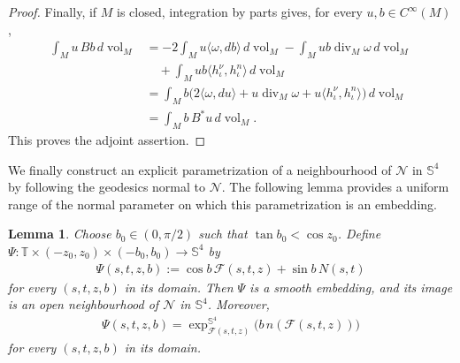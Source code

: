 \documentclass[a4paper,11pt,oneside,reqno]{amsart}
\numberwithin{equation}{section}
\newtheorem{lemma}[theorem]{Lemma}
\theoremstyle{definition}
\begin{document}
\begin{proof}
    Finally, if $M$ is closed, integration by parts
    gives, for every $u,b\in C^\infty(M)$,
    \begin{align*}
        \int_M u\,Bb\,d\operatorname{vol}_M
        &=-2\int_Mu\langle\omega,db\rangle\,d\operatorname{vol}_M
        -\int_Mub\operatorname{div}_M\omega\,d\operatorname{vol}_M\\
        &\quad+\int_Mub\langle h_\iota^\nu,h_\iota^n\rangle\,d\operatorname{vol}_M\\
        &=\int_Mb\bigl(
        2\langle\omega,du\rangle
        +u\operatorname{div}_M\omega
        +u\langle h_\iota^\nu,h_\iota^n\rangle\bigr)\,d\operatorname{vol}_M\\
        &=\int_M b\,B^*u\,d\operatorname{vol}_M.
    \end{align*}
    This proves the adjoint assertion.
\end{proof}
%
We finally construct an explicit parametrization of a
neighbourhood of $\mathcal{N}$ in $\mathbb{S}^4$ by following the geodesics normal to $\mathcal{N}$. The following lemma provides a uniform range of the normal parameter on which this parametrization is an embedding.
%
\begin{lemma}
    \label{lem:s4-tubular}
    Choose $b_0\in(0,\pi/2)$ such that
    $\tan b_0<\cos z_0$. Define
    $\Psi:\mathbb{T}\times(-z_0,z_0)\times(-b_0,b_0)
    \to\mathbb{S}^4$ by
    \begin{align}
        \label{eq:s4-tubular-map}
        \Psi(s,t,z,b)
        :=\cos b\,\mathcal{F}(s,t,z)+\sin b\,N(s,t)
    \end{align}
    for every $(s,t,z,b)$ in its domain.
    Then $\Psi$ is a smooth embedding, and its image is
    an open neighbourhood of $\mathcal{N}$ in $\mathbb{S}^4$.
    Moreover,
    \begin{align*}
        \Psi(s,t,z,b)
        =\exp^{\mathbb{S}^4}_{\mathcal{F}(s,t,z)}
        \bigl(b\,n(\mathcal{F}(s,t,z))\bigr)
    \end{align*}
    for every $(s,t,z,b)$ in its domain.
\end{lemma}
\end{document}
